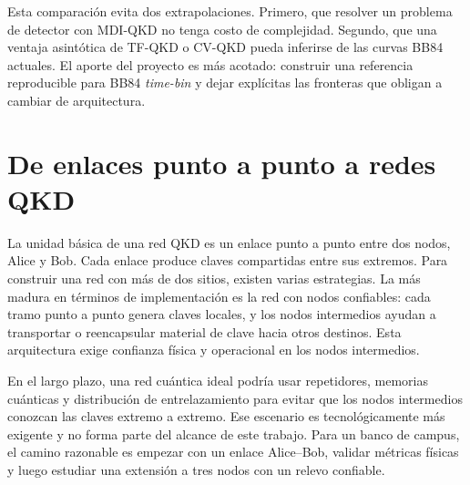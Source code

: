 Esta comparación evita dos extrapolaciones. Primero, que resolver un problema de detector con MDI-QKD no tenga costo de complejidad. Segundo, que una ventaja asintótica de TF-QKD o CV-QKD pueda inferirse de las curvas BB84 actuales. El aporte del proyecto es más acotado: construir una referencia reproducible para BB84 \textit{time-bin} y dejar explícitas las fronteras que obligan a cambiar de arquitectura.

\section{De enlaces punto a punto a redes QKD}

La unidad básica de una red QKD es un enlace punto a punto entre dos nodos, Alice y Bob. Cada enlace produce claves compartidas entre sus extremos. Para construir una red con más de dos sitios, existen varias estrategias. La más madura en términos de implementación es la red con nodos confiables: cada tramo punto a punto genera claves locales, y los nodos intermedios ayudan a transportar o reencapsular material de clave hacia otros destinos. Esta arquitectura exige confianza física y operacional en los nodos intermedios.

En el largo plazo, una red cuántica ideal podría usar repetidores, memorias cuánticas y distribución de entrelazamiento para evitar que los nodos intermedios conozcan las claves extremo a extremo. Ese escenario es tecnológicamente más exigente y no forma parte del alcance de este trabajo. Para un banco de campus, el camino razonable es empezar con un enlace Alice--Bob, validar métricas físicas y luego estudiar una extensión a tres nodos con un relevo confiable.

